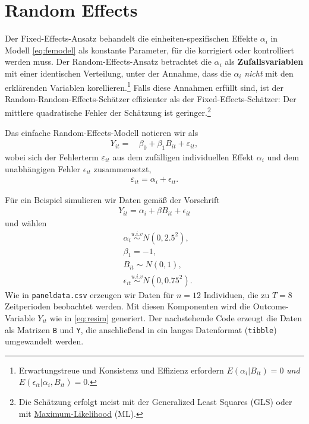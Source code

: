 \documentclass[
  a4paper,
  DIV=11,
  oneside]{scrreprt}
\begin{document}
\section{Random Effects}\label{random-effects}

Der Fixed-Effects-Ansatz behandelt die einheiten-spezifischen Effekte
\(\alpha_i\) in Modell \eqref{eq:femodel} als konstante Parameter, für
die korrigiert oder kontrolliert werden muss. Der Random-Effects-Ansatz
betrachtet die \(\alpha_i\) als \textbf{Zufallsvariablen} mit einer
identischen Verteilung, unter der Annahme, dass die \(\alpha_i\)
\emph{nicht} mit den erklärenden Variablen korellieren.\footnote{Erwartungstreue
  und Konsistenz und Effizienz erfordern \(E(\alpha_i\vert B_{it})=0\)
  \emph{und} \(E(\epsilon_{it}\vert\alpha_i,B_{it})=0\).} Falls diese
Annahmen erfüllt sind, ist der Random-Random-Effects-Schätzer
effizienter als der Fixed-Effects-Schätzer: Der mittlere quadratische
Fehler der Schätzung ist geringer.\footnote{Die Schätzung erfolgt meist
  mit der Generalized Least Squares (GLS) oder mit
  \href{https://de.wikipedia.org/wiki/Maximum-Likelihood-Methode}{Maximum-Likelihood}
  (ML).}

Das einfache Random-Effects-Modell notieren wir als \begin{align*}
  Y_{it} =&\, \beta_0 + \beta_1 B_{it} + \varepsilon_{it},
\end{align*} wobei sich der Fehlerterm \(\varepsilon_{it}\) aus dem
zufälligen individuellen Effekt \(\alpha_i\) und dem unabhängigen Fehler
\(\epsilon_{it}\) zusammensetzt, \begin{align*}
  \varepsilon_{it} = \alpha_i + \epsilon_{it}.
\end{align*}

Für ein Beispiel simulieren wir Daten gemäß der Vorschrift \begin{align}
  Y_{it} = \alpha_i + \beta B_{it} + \epsilon_{it}\label{eq:resim}
\end{align} und wählen \begin{align*}
  & \alpha_i \overset{u.i.v}{\sim} N(0,2.5^2), \\
  & \beta_1 = -1,\\
  & B_{it} \sim N(0,1),\\
  & \epsilon_{it} \overset{u.i.v}{\sim} N(0,0.75^2).
\end{align*} Wie in \texttt{paneldata.csv} erzeugen wir Daten für
\(n=12\) Individuen, die zu \(T=8\) Zeitperioden beobachtet werden. Mit
diesen Komponenten wird die Outcome-Variable \(Y_{it}\) wie in
\eqref{eq:resim} generiert. Der nachstehende Code erzeugt die Daten als
Matrizen \texttt{B} und \texttt{Y}, die anschließend in ein langes
Datenformat (\texttt{tibble}) umgewandelt werden.
\end{document}
